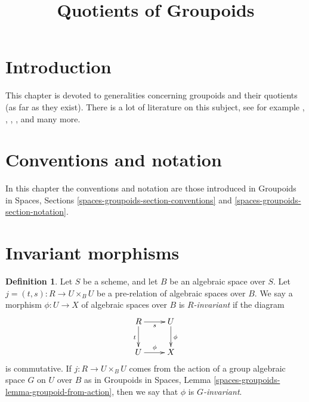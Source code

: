 \documentclass{stacks-project}
\theoremstyle{plain}
\theoremstyle{definition}
\newtheorem{definition}[subsection]{Definition}
\theoremstyle{remark}
\numberwithin{equation}{subsection}
\begin{document}
\title{Quotients of Groupoids}


\maketitle

\label{section-phantom}

\tableofcontents

\section{Introduction}
\label{section-introduction}

\noindent
This chapter is devoted to generalities concerning groupoids and their
quotients (as far as they exist).
There is a lot of literature on this subject, see for example
\cite{GIT}, \cite{seshadri_quotients}, \cite{KollarQuotients},
\cite{K-M}, \cite{KollarFinite} and many more.





\section{Conventions and notation}
\label{section-conventions-notation}

\noindent
In this chapter the conventions and notation are those introduced in
Groupoids in Spaces, Sections \ref{spaces-groupoids-section-conventions}
and \ref{spaces-groupoids-section-notation}.


\section{Invariant morphisms}
\label{section-invariant}

\begin{definition}
\label{definition-invariant}
Let $S$ be a scheme, and let $B$ be an algebraic space over $S$.
Let $j = (t, s) : R \to U \times_B U$ be a pre-relation of algebraic
spaces over $B$. We say a morphism $\phi : U \to X$ of algebraic spaces
over $B$ is {\it $R$-invariant} if the diagram
$$
\xymatrix{
R \ar[r]_s \ar[d]_t & U \ar[d]^\phi \\
U \ar[r]^\phi & X
}
$$
is commutative. If $j : R \to U \times_B U$ comes from the action
of a group algebraic space $G$ on $U$ over $B$ as in
Groupoids in Spaces, Lemma \ref{spaces-groupoids-lemma-groupoid-from-action},
then we say that $\phi$ is {\it $G$-invariant}.
\end{definition}
\end{document}
